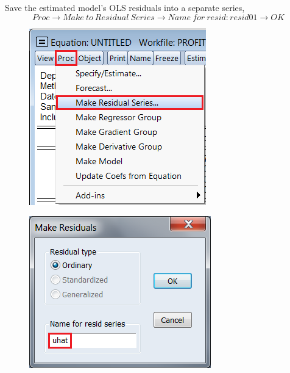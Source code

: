 \documentclass[12pt]{report}
\begin{document}
\noindent Save the estimated model's OLS residuals into a separate series,
$$Proc \to Make\ to\ Residual\ Series \to Name\ for\ resid:resid01 \to OK$$
\begin{figure}[H]
	\centering
	\includegraphics{q1_2}
\end{figure}
\vspace{-\baselineskip}
\begin{figure}[H]
	\centering
	\includegraphics{q1_3}
\end{figure}
\vspace{-\baselineskip}
\end{document}
